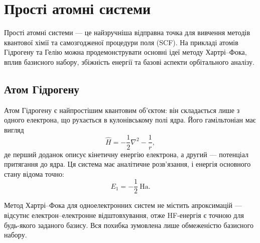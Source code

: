 
\section{Прості атомні системи}

Прості атомні системи --- це найзручніша відправна точка для вивчення методів квантової хімії та самозгодженої процедури поля (SCF).
На прикладі атомів Гідрогену та Гелію можна продемонструвати основні ідеї методу Хартрі–Фока, вплив базисного набору, збіжність енергії та базові аспекти орбітального аналізу.

\subsection{Атом Гідрогену}

Атом Гідрогену є найпростішим квантовим об'єктом: він складається лише з одного електрона, що рухається в кулонівському полі ядра. Його гамільтоніан має вигляд
\[
\hat{H} = -\frac{1}{2}\nabla^2 - \frac{1}{r},
\]
де перший доданок описує кінетичну енергію електрона, а другий --- потенціал притягання до ядра.
Ця система має аналітичне розв’язання, і енергія основного стану відома точно:
\[
E_1 = -\frac{1}{2}\ \text{Ha}.
\]

Метод Хартрі–Фока для одноелектронних систем не містить апроксимацій --- відсутнє електрон–електронне відштовхування, отже HF-енергія є точною для будь-якого заданого базису. Вся похибка зумовлена лише обмеженістю базисного набору.


%

